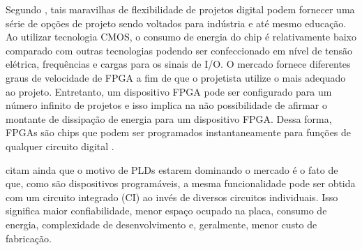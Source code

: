    Segundo \citeauthor{tocci2003sistemas}, tais maravilhas de flexibilidade de projetos digital podem fornecer uma série de opções de projeto sendo voltados para indústria e até mesmo educação.
   Ao utilizar tecnologia CMOS, o consumo de energia do chip é relativamente baixo comparado com outras tecnologias podendo ser confeccionado em nível de tensão elétrica, frequências e cargas para os sinais de I/O.
   O mercado fornece diferentes graus de velocidade de FPGA a fim de que o projetista utilize o mais adequado ao projeto.
   Entretanto, um dispositivo FPGA pode ser configurado para um número infinito de projetos e isso implica na não possibilidade de afirmar o montante de dissipação de energia para um dispositivo FPGA.
   Dessa forma, FPGAs são chips que podem ser programados instantaneamente para funções de qualquer circuito digital \citep{Choi2016}.

   \citeauthor{tocci2003sistemas, Plessl2003} citam ainda que o motivo de PLDs estarem dominando o mercado é o fato de que, como são dispositivos programáveis, a mesma funcionalidade pode ser obtida com um circuito integrado (CI) ao invés de diversos circuitos individuais.
   Isso significa maior confiabilidade, menor espaço ocupado na placa, consumo de energia, complexidade de desenvolvimento e, geralmente, menor custo de fabricação.

